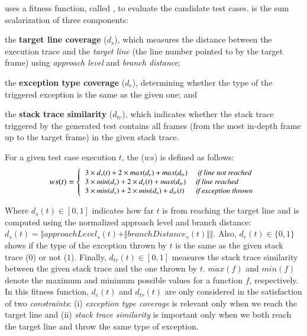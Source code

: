 \evocrash uses a fitness function, called \WS, to evaluate the candidate test cases. \WS is the sum scalarization of three components:
\begin{inparaenum}[(i)]
    \item the \textbf{target line coverage} ($d_{s}$), which measures the distance between the execution trace and the \textit{target line} (\ie the line number pointed to by the target frame) using \textit{approach level} and \textit{branch distance};
    \item the \textbf{exception type coverage}  ($d_{e}$), determining whether the type of the triggered exception is the same as the given one; and 
   \item the \textbf{stack trace similarity}  ($d_{tr}$), which indicates whether the stack trace triggered by the generated test contains all frames (from the most in-depth frame up to the target frame) in the given stack trace.
   \end{inparaenum}

   \begin{definition}
    For a given test case execution $t$, the \WS ($ws$) is defined as follows:
    \begin{equation}
    \small
    ws(t) = 
    \left\{
        \begin{array}{ll}
          3 \times d_{s}(t) + 2 \times max(d_{e}) + max(d_{tr}) & \textit{ if line not reached}\\
          3 \times min(d_{s}) + 2 \times d_{e}(t) + max(d_{tr}) & \textit{if line reached}\\
          3 \times min(d_{s}) + 2 \times min(d_{e}) + d_{tr}(t) & \textit{if exception thrown}
        \end{array}
      \right.
     \end{equation}
    \end{definition}
%
Where $d_{s}(t) \in [0,1]$ indicates how far $t$ is from reaching the target line and is computed using the normalized approach level and branch distance: $d_{s}(t) = \Vert approachLevel_{s}(t)  + \Vert branchDistance_{s}(t)\Vert\Vert$. 
Also, $d_{e}(t) \in \{0,1\}$ shows if the type of the exception thrown by $t$ is the same as the given stack trace ($0$) or not ($1$). Finally, $d_{tr}(t) \in [0,1]$ measures the stack trace similarity between the given stack trace and the one thrown by $t$. $max(f)$ and $min(f)$ denote the maximum and minimum possible values for a function $f$, respectively.
In this fitness function, $d_{e}(t)$ and $d_{tr}(t)$ are only considered in the satisfaction of two \textit{constraints}: (i) \textit{exception type coverage} is relevant only 
when we reach the target line and (ii) \textit{stack trace similarity} is important only when we both reach the target line and throw the same type of exception.

